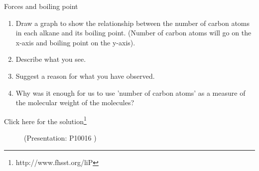 \begin{exercises}{Forces and boiling point}
{\begin{enumerate}[noitemsep, label=\textbf{\arabic*}. ]
            \label{m38734*uid46}\item Draw a 
graph to show the relationship between the number of carbon atoms in each 
alkane and its boiling point. (Number of carbon atoms will go on the x-axis and 
boiling point on the y-axis).
\label{m38734*uid47}\item Describe what you see.
\label{m38734*uid48}\item Suggest a reason for what you have observed.
\label{m38734*uid49}\item Why was it enough for us to use 'number of carbon atoms' 
as a measure of the molecular weight of the molecules?
\end{enumerate}
        Click here for the solution\footnote{http://www.fhsst.org/liP}
        \par }
\end{exercises}
\label{m38734*eip-661}
    \setcounter{subfigure}{0}
	\begin{figure}[H] %
    \label{m38734*slidesharemedia1}\label{m38734*slideshareflash1}
             { (Presentation:  P10016 )}
      \vspace{2pt}
    \vspace{.1in}
 \end{figure}       \par 
\label{m38734**end}
